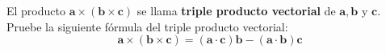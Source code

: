 \item El producto $\mathbf{a} \times (\mathbf{b} \times \mathbf{c})$ se llama \textbf{triple producto vectorial} de $\mathbf{a, b}$ y $\mathbf{c}$. Pruebe la siguiente fórmula del triple producto vectorial:
    \[
    \mathbf{a} \times (\mathbf{b} \times \mathbf{c}) = (\mathbf{a} \cdot \mathbf{c})\mathbf{b} - (\mathbf{a} \cdot \mathbf{b})\mathbf{c}
    \]
